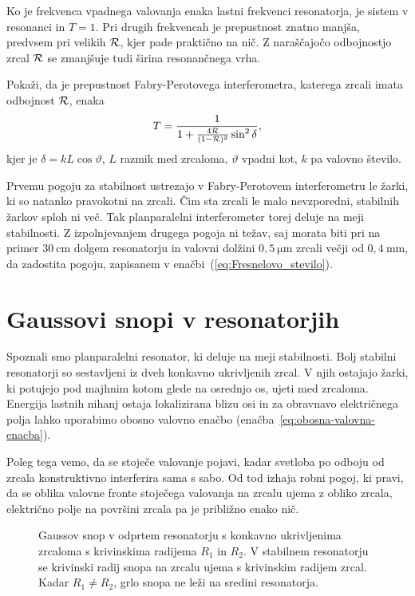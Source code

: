 Ko je frekvenca vpadnega valovanja enaka lastni frekvenci
resonatorja, je sistem v resonanci in $T=1$. Pri drugih frekvencah je prepustnost znatno manjša, predvsem
pri velikih $\cal{R}$, kjer pade praktično na nič. Z naraščajočo odbojnostjo zrcal ${\cal R}$ 
se zmanjšuje tudi širina resonančnega vrha.
\begin{definition}
\label{naloga:FP}
Pokaži, da je prepustnost Fabry-Perotovega interferometra, katerega zrcali imata odbojnost $\cal{R}$, enaka 
\begin{equation}
T = \frac{1}{1+\frac{4\cal{R}}{(1-{\cal R})^2}\sin^2 \delta},
\label{eq:FP}
\end{equation}
kjer je $\delta = kL\cos{\vartheta}$, $L$ razmik med zrcaloma, $\vartheta$ vpadni kot, 
$k$ pa valovno število.
\end{definition}

Prvemu pogoju za stabilnost ustrezajo v Fabry-Perotovem interferometru
le žarki, ki so natanko pravokotni na zrcali. Čim sta zrcali le
malo nevzporedni, stabilnih žarkov sploh ni več. Tak 
planparalelni interferometer torej deluje 
na meji stabilnosti. Z izpolnjevanjem drugega
pogoja ni težav, saj morata biti pri na primer $30~\si{\centi\metre}$ dolgem resonatorju in 
valovni dolžini $0,5~\si{\micro\metre}$ zrcali večji od $0,4~\si{\milli\metre}$, da zadostita pogoju, 
zapisanem v enačbi~(\ref{eq:Fresnelovo_stevilo}).

\section{Gaussovi snopi v resonatorjih}
Spoznali smo planparalelni resonator, ki deluje na meji stabilnosti. 
Bolj stabilni resonatorji so sestavljeni iz dveh konkavno ukrivljenih
zrcal. V njih ostajajo žarki, ki potujejo pod majhnim kotom glede na osrednjo os, ujeti
med zrcaloma. Energija lastnih nihanj ostaja lokalizirana blizu osi in za obravnavo
električnega polja lahko uporabimo obosno valovno 
enačbo (enačba~\ref{eq:obosna-valovna-enacba}). 

Poleg tega vemo, da se stoječe valovanje pojavi, kadar
svetloba po odboju od zrcala konstruktivno interferira sama s sabo.
Od tod izhaja robni pogoj, ki pravi, da se oblika valovne fronte stoječega valovanja na 
zrcalu ujema z obliko zrcala, električno polje na površini zrcala
pa je približno enako nič.

\begin{figure}[h]
\centering
\def\svgwidth{110truemm} 

\caption{Gaussov snop v odprtem resonatorju s konkavno ukrivljenima zrcaloma
s krivinskima radijema $R_1$ in $R_2$. V stabilnem resonatorju se krivinski 
radij snopa na zrcalu ujema s krivinskim radijem zrcal. Kadar $R_1 \neq R_2$, 
grlo snopa ne leži na sredini resonatorja.}
\label{fig:Gaussov-snop-v-resonatorju}
\end{figure}

